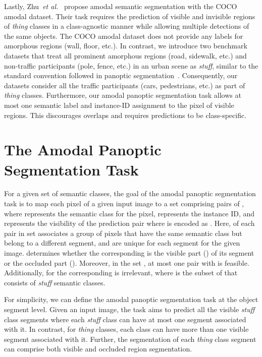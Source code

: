 \documentclass[10pt,twocolumn,letterpaper]{article}
\begin{document}
Lastly, Zhu~\textit{et al.}~\cite{zhu2017semantic} propose amodal semantic segmentation with the COCO amodal dataset. Their task requires the prediction of visible and invisible regions of \textit{thing} classes in a class-agnostic manner while allowing multiple detections of the same objects. The COCO amodal dataset does not provide any labels for amorphous regions (wall, floor, etc.). In contrast, we introduce two benchmark datasets that treat all prominent amorphous regions (road, sidewalk, etc.) and non-traffic participants (pole, fence, etc.) in an urban scene as \textit{stuff}, similar to the standard convention followed in panoptic segmentation~\cite{kirillov2019panoptic}. Consequently, our datasets consider all the traffic participants (cars, pedestrians, etc.) as part of \textit{thing} classes. Furthermore, our amodal panoptic segmentation task allows at most one semantic label and instance-ID assignment to the pixel of visible regions. This discourages overlaps and requires predictions to be class-specific. 
\section{The Amodal Panoptic Segmentation Task}
For a given set of  semantic classes, the goal of the amodal panoptic segmentation task is to map each pixel  of a given input image to a set  comprising pairs of , where  represents the semantic class for the pixel,  represents the instance ID, and  represents the visibility of the prediction pair where  is encoded as . Here,  of each pair in set  associates a group of pixels that have the same semantic class but belong to a different segment, and are unique for each segment for the given image.  determines whether the corresponding  is the visible part () of its segment or the occluded part (). Moreover, in the set , at most one pair with  is feasible. Additionally, for  the corresponding  is irrelevant, where  is the subset of  that consists of \textit{stuff} semantic classes.  

For simplicity, we can define the amodal panoptic segmentation task at the object segment level. Given an input image, the task aims to predict all the visible \textit{stuff} class segments where each \textit{stuff} class can have at most one segment associated with it. In contrast, for \textit{thing} classes, each class can have more than one visible segment associated with it. Further, the segmentation of each \textit{thing} class segment can comprise both visible and occluded region segmentation.
%
 
\end{document}
